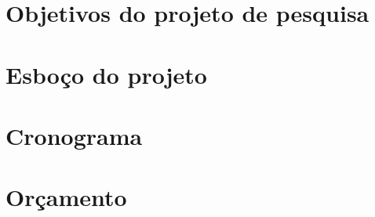 \section{Objetivos do projeto de pesquisa}
\label{sec:obj}

\newpage

\section{Esboço do projeto}
\label{sec:proj}

\newpage

\section{Cronograma}
\label{sec:cronos}
%
\newpage

\section{Orçamento}
\label{sec:orc}
%
\newpage

\printbibliography


